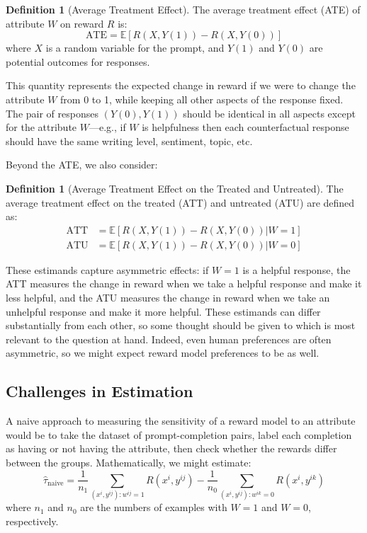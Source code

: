 \documentclass{article}
\theoremstyle{definition}
\newtheorem{definition}[theorem]{Definition}
\newcommand{\EE}{\mathbb{E}}
\begin{document}
\begin{definition}[Average Treatment Effect]
The average treatment effect (ATE) of attribute $W$ on reward $R$ is:
\[ \text{ATE} = \EE[{R(X, Y(1)) - R(X, Y(0))}] \]
where $X$ is a random variable for the prompt, and $Y(1)$ and $Y(0)$ are potential outcomes for responses.
\end{definition}

This quantity represents the expected change in reward if we were to change the attribute $W$ from 0 to 1, while keeping all other aspects of the response fixed. The pair of responses $(Y(0),Y(1))$ should be identical in all aspects except for the attribute $W$—e.g., if $W$ is helpfulness then each counterfactual response should have the same writing level, sentiment, topic, etc.

Beyond the ATE, we also consider:

\begin{definition}[Average Treatment Effect on the Treated and Untreated]
The average treatment effect on the treated (ATT) and untreated (ATU) are defined as:
\begin{align*}
    \text{ATT} &= \EE[{R(X, Y(1)) - R(X, Y(0))|W=1}] \\
    \text{ATU} &= \EE[{R(X, Y(1)) - R(X, Y(0))|W=0}]
\end{align*}
\end{definition}

These estimands capture asymmetric effects: if $W=1$ is a helpful response, the ATT measures the change in reward when we take a helpful response and make it less helpful, and the ATU measures the change in reward when we take an unhelpful response and make it more helpful. These estimands can differ substantially from each other, so some thought should be given to which is most relevant to the question at hand. Indeed, even human preferences are often asymmetric, so we might expect reward model preferences to be as well.

\subsection{Challenges in Estimation}
A naive approach to measuring the sensitivity of a reward model to an attribute would be to take the dataset of prompt-completion pairs, label each completion as having or not having the attribute, then check whether the rewards differ between the groups. Mathematically, we might estimate:
\[\hat{\tau}_{\text{naive}} = \frac{1}{n_1} \sum_{(x^i, y^{ij}): w^{ij} = 1} R(x^i, y^{ij}) - \frac{1}{n_0} \sum_{(x^i, y^{ij}):w^{ik}=0} R(x^i, y^{ik})\]
where $n_1$ and $n_0$ are the numbers of examples with $W = 1$ and $W = 0$, respectively.
\end{document}
